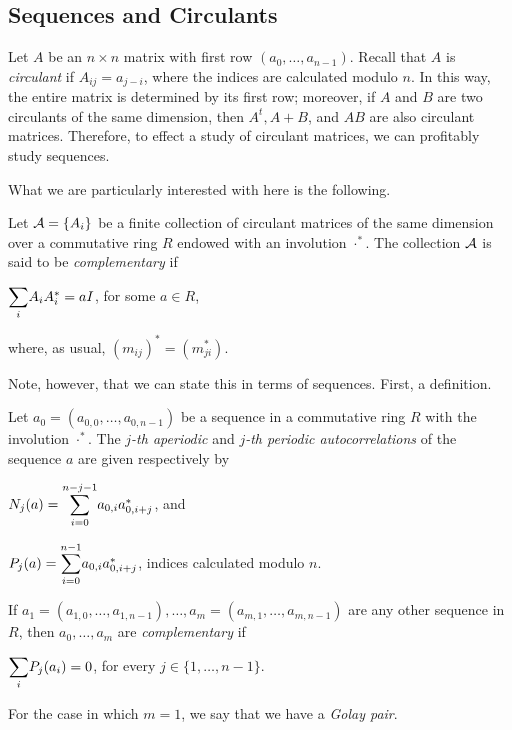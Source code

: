 \documentclass[../../../main]{subfiles}
\begin{document}
 \subsection{Sequences and Circulants}
 
 Let $A$ be an $n \times n$ matrix with first row $(a_0,\dots,a_{n-1})$. Recall that $A$ is {\it circulant} if $A_{ij}=a_{j-i}$, where the indices are calculated modulo $n$. In this way, the entire matrix is determined by its first row; moreover, if $A$ and $B$ are two circulants of the same dimension, then $A^t,A+B$, and $AB$ are also circulant matrices. Therefore, to effect a study of circulant matrices, we can profitably study sequences. 
 
 What we are particularly interested with here is the following.
 
 \begin{defin}
  Let $\mathcal{A}=\{A_i\}$ be a finite collection of circulant matrices of the same dimension over a commutative ring $R$ endowed with an involution $\cdot^*$. The collection $\mathcal{A}$ is said to be {\it complementary} if
  \begin{defenum}
   \item $\ssum_i A_iA_i^* = aI$, for some $a \in R$,
  \end{defenum}
  where, as usual, $(m_{ij})^*=(m_{ji}^*)$.
 \end{defin}
 
 Note, however, that we can state this in terms of sequences. First, a definition.
 
 \begin{defin}
  Let $a_0=(a_{0,0}, \dots, a_{0,n-1})$ be a sequence in a commutative ring $R$ with the involution $\cdot^*$. The {\it $j$-th aperiodic} and {\it $j$-th periodic autocorrelations} of the sequence $a$ are given respectively by
  \begin{defenum}
   \item $N_j(a)=\ssum_{i=0}^{n-j-1}a_{0,i}a_{0,i+j}^*$, and
   \item $P_j(a)=\ssum_{i=0}^{n-1}a_{0,i}a_{0,i+j}^*$, indices calculated modulo $n$.
  \end{defenum}
  If $a_1=(a_{1,0},\dots,a_{1,n-1}),\dots,a_m=(a_{m,1},\dots,a_{m,n-1})$ are any other sequence in $R$, then $a_0,\dots,a_m$ are {\it complementary} if
  \begin{defenum}[resume]
   \item\label{periodic-comp} $\ssum_i P_j(a_i)=0$, for every $j \in \{1, \dots, n-1\}$.
  \end{defenum}
  For the case in which $m=1$, we say that we have a {\it Golay pair}.
 \end{defin}
 
\end{document}
